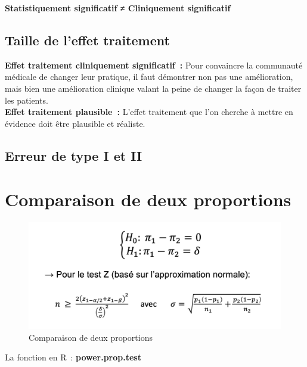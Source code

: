 \vspace{0.15cm}

\begin{center}
    \textbf{Statistiquement significatif ≠ Cliniquement significatif}
\end{center}

\subsection{Taille de l’effet traitement}
\textbf{Effet traitement cliniquement significatif : }Pour convaincre la communauté médicale de changer leur pratique, il faut démontrer non pas une amélioration, mais bien une amélioration clinique valant la peine de changer la façon de traiter les patients.\\
\textbf{Effet traitement plausible : }L’effet traitement que l’on cherche à mettre en évidence doit être plausible et réaliste.\\

\subsection{Erreur de type I et II}


\section{Comparaison de deux proportions}
\begin{figure}[H]
    \centering
    \includegraphics[scale=0.5]{images/comparasion2proportions.png}
    \caption{Comparaison de deux proportions}
    \label{fig:comp2propor}
\end{figure}
La fonction en R : \textbf{power.prop.test}

